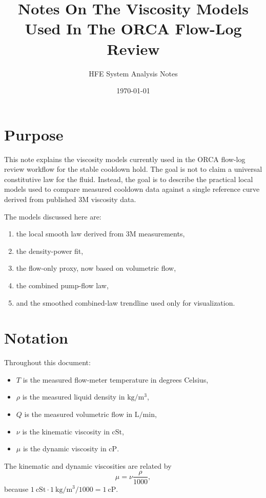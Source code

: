 \documentclass[11pt]{article}
\title{Notes On The Viscosity Models Used In The ORCA Flow-Log Review}
\author{HFE System Analysis Notes}
\date{\today}
\begin{document}
\maketitle

\section{Purpose}

This note explains the viscosity models currently used in the ORCA flow-log
review workflow for the stable cooldown hold. The goal is not to claim a
universal constitutive law for the fluid. Instead, the goal is to describe the
practical local models used to compare measured cooldown data against a single
reference curve derived from published 3M viscosity data.

The models discussed here are:
\begin{enumerate}
    \item the local smooth law derived from 3M measurements,
    \item the density-power fit,
    \item the flow-only proxy, now based on volumetric flow,
    \item the combined pump-flow law,
    \item and the smoothed combined-law trendline used only for visualization.
\end{enumerate}

\section{Notation}

Throughout this document:
\begin{itemize}
    \item $T$ is the measured flow-meter temperature in degrees Celsius,
    \item $\rho$ is the measured liquid density in $\mathrm{kg/m^3}$,
    \item $Q$ is the measured volumetric flow in $\mathrm{L/min}$,
    \item $\nu$ is the kinematic viscosity in $\mathrm{cSt}$,
    \item $\mu$ is the dynamic viscosity in $\mathrm{cP}$.
\end{itemize}

The kinematic and dynamic viscosities are related by
\begin{equation}
    \mu = \nu \frac{\rho}{1000},
\end{equation}
because $1~\mathrm{cSt} \cdot 1~\mathrm{kg/m^3} / 1000 = 1~\mathrm{cP}$.
\end{document}
